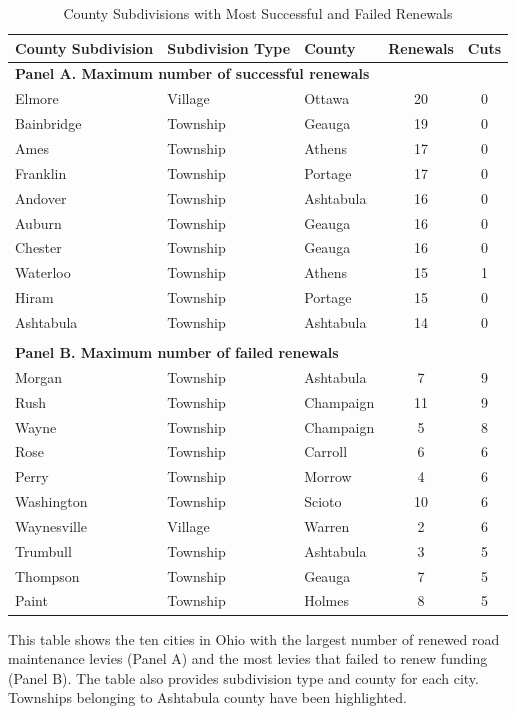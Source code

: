 \begin{table}[ht]
    \centering
    \caption{County Subdivisions with Most Successful and Failed Renewals}
    \label{tab:max_renewals_cuts}
    \begin{threeparttable}
    \begin{tabular}{p{4cm}p{3cm}p{3cm}cc}
        \hline
        County Subdivision & Subdivision Type & County & Renewals & Cuts \\
        \hline
        \multicolumn{5}{l}{\textbf{Panel A. Maximum number of successful renewals}} \\
        Elmore & Village & Ottawa & 20 & 0 \\
        Bainbridge & Township & Geauga & 19 & 0 \\
        Ames & Township & Athens & 17 & 0 \\
        Franklin & Township & Portage & 17 & 0 \\
        Andover & Township & Ashtabula & 16 & 0 \\
        Auburn & Township & Geauga & 16 & 0 \\
        Chester & Township & Geauga & 16 & 0 \\
        Waterloo & Township & Athens & 15 & 1 \\
        Hiram & Township & Portage & 15 & 0 \\
        Ashtabula & Township & Ashtabula & 14 & 0 \\
        \\
        \multicolumn{5}{l}{\textbf{Panel B. Maximum number of failed renewals}} \\
        Morgan & Township & Ashtabula & 7 & 9 \\
        Rush & Township & Champaign & 11 & 9 \\
        Wayne & Township & Champaign & 5 & 8 \\
        Rose & Township & Carroll & 6 & 6 \\
        Perry & Township & Morrow & 4 & 6 \\
        Washington & Township & Scioto & 10 & 6 \\
        Waynesville & Village & Warren & 2 & 6 \\
        Trumbull & Township & Ashtabula & 3 & 5 \\
        Thompson & Township & Geauga & 7 & 5 \\
        Paint & Township & Holmes & 8 & 5 \\
        \hline
    \end{tabular}
    \begin{tablenotes}
        \small
        \item This table shows the ten cities in Ohio with the largest number of renewed road maintenance levies (Panel A) and the most levies that failed to renew funding (Panel B). The table also provides subdivision type and county for each city. Townships belonging to Ashtabula county have been highlighted.  
    \end{tablenotes}
    \end{threeparttable}
\end{table}

